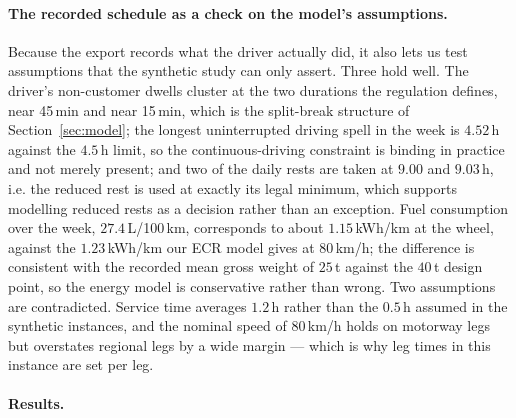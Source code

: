 \paragraph{The recorded schedule as a check on the model's assumptions.}
Because the export records what the driver actually did, it also lets us test
assumptions that the synthetic study can only assert.  Three hold well.  The
driver's non-customer dwells cluster at the two durations the regulation
defines, near 45\,min and near 15\,min, which is the split-break structure of
Section~\ref{sec:model}; the longest uninterrupted driving spell in the week is
$4.52$\,h against the $4.5$\,h limit, so the continuous-driving constraint is
binding in practice and not merely present; and two of the daily rests are
taken at $9.00$ and $9.03$\,h, i.e. the reduced rest is used at exactly its
legal minimum, which supports modelling reduced rests as a decision rather than
an exception.  Fuel consumption over the week, $27.4$\,L/100\,km, corresponds to
about $1.15$\,kWh/km at the wheel, against the $1.23$\,kWh/km our ECR model
gives at 80\,km/h; the difference is consistent with the recorded mean gross
weight of $25$\,t against the $40$\,t design point, so the energy model is
conservative rather than wrong.  Two assumptions are contradicted.  Service
time averages $1.2$\,h rather than the $0.5$\,h assumed in the synthetic
instances, and the nominal speed of $80$\,km/h holds on motorway legs but
overstates regional legs by a wide margin --- which is why leg times in this
instance are set per leg.

\paragraph{Results.}

